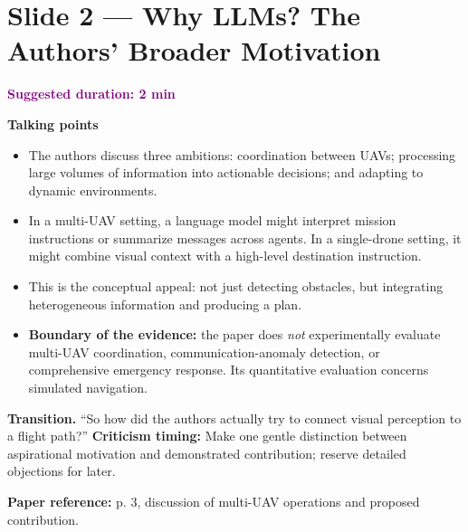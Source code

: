 \documentclass[11pt,a4paper]{article}
\newcommand{\slide}[3]{\clearpage\section*{Slide #1 --- #2}\textcolor{purple}{\textbf{Suggested duration: #3}}\par\medskip}
\newcommand{\source}[1]{\par\small\textcolor{deep}{\textbf{Paper reference:} #1}\normalsize}
\begin{document}
\slide{2}{Why LLMs? The Authors' Broader Motivation}{2 min}
\textbf{Talking points}
\begin{itemize}
\item The authors discuss three ambitions: coordination between UAVs; processing large volumes of information into actionable decisions; and adapting to dynamic environments.
\item In a multi-UAV setting, a language model might interpret mission instructions or summarize messages across agents. In a single-drone setting, it might combine visual context with a high-level destination instruction.
\item This is the conceptual appeal: not just detecting obstacles, but integrating heterogeneous information and producing a plan.
\item \textbf{Boundary of the evidence:} the paper does \emph{not} experimentally evaluate multi-UAV coordination, communication-anomaly detection, or comprehensive emergency response. Its quantitative evaluation concerns simulated navigation.
\end{itemize}
\textbf{Transition.} ``So how did the authors actually try to connect visual perception to a flight path?''
\textbf{Criticism timing:} Make one gentle distinction between aspirational motivation and demonstrated contribution; reserve detailed objections for later.
\source{p. 3, discussion of multi-UAV operations and proposed contribution.}
\end{document}
